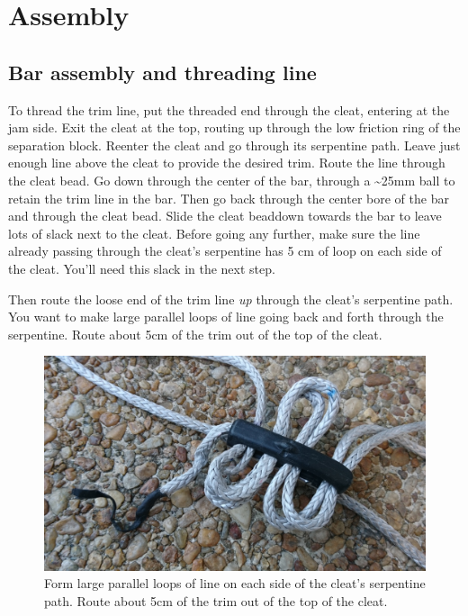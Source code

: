 \documentclass[]{book}
\begin{document}
\hypertarget{assembly}{%
\chapter{Assembly}\label{assembly}}

\hypertarget{bar-assembly-and-threading-line}{%
\section{Bar assembly and threading line}\label{bar-assembly-and-threading-line}}

To thread the trim line, put the threaded end through the cleat, entering at the jam side. Exit the cleat at the top, routing up through the low friction ring of the separation block. Reenter the cleat and go through its serpentine path. Leave just enough line above the cleat to provide the desired trim. Route the line through the cleat bead. Go down through the center of the bar, through a \textasciitilde{}25mm ball to retain the trim line in the bar. Then go back through the center bore of the bar and through the cleat bead. Slide the cleat beaddown towards the bar to leave lots of slack next to the cleat. Before going any further, make sure the line already passing through the cleat's serpentine has 5 cm of loop on each side of the cleat. You'll need this slack in the next step.

Then route the loose end of the trim line \emph{up} through the cleat's serpentine path. You want to make large parallel loops of line going back and forth through the serpentine. Route about 5cm of the trim out of the top of the cleat.

\begin{figure}

{\centering \includegraphics[width=0.7\linewidth]{images/threading_the_cleat_1} 

}

\caption{Form large parallel loops of line on each side of the cleat's serpentine path. Route about 5cm of the trim out of the top of the cleat.}\label{fig:thread-cleat-1}
\end{figure}
\end{document}
